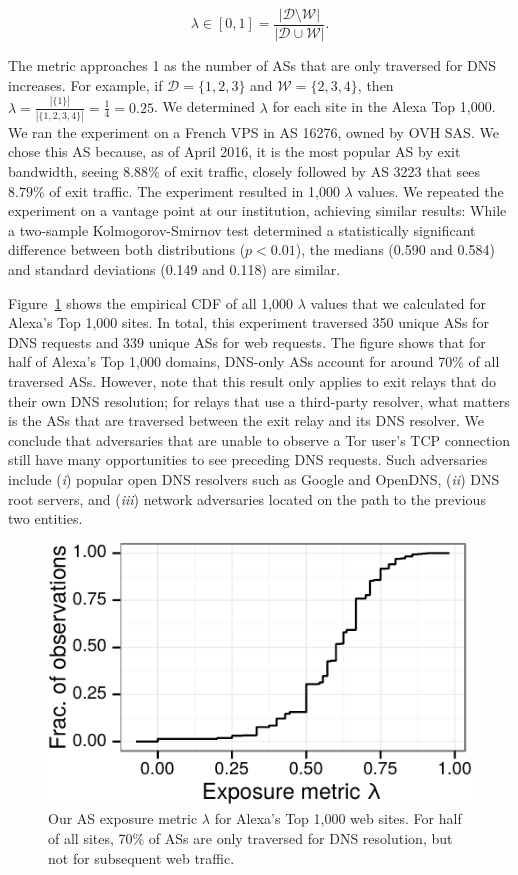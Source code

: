 \begin{equation}
\label{equ:exposure}
\lambda \in [0, 1] =
\frac{|\mathcal{D} \setminus \mathcal{W}|}
     {|\mathcal{D} \cup \mathcal{W}|}.
\end{equation}

The metric approaches 1 as the number of ASs that are only traversed for DNS
increases.  For example, if $\mathcal{D} = \{1,2,3\}$ and $\mathcal{W} =
\{2,3,4\}$, then $\lambda = \frac{|\{1\}|}{|\{1,2,3,4\}|} = \frac{1}{4} =
0.25$.  We determined $\lambda$ for each site in the Alexa Top 1,000.  We ran
the experiment on a French VPS in AS 16276, owned by OVH SAS.  We chose this AS
because, as of April 2016, it is the most popular AS by exit bandwidth, seeing
$8.88\%$ of exit traffic, closely followed by AS 3223 that sees $8.79\%$ of
exit traffic.  The experiment resulted in 1,000 $\lambda$ values.  We repeated
the experiment on a vantage point at our institution, achieving similar
results: While a two-sample Kolmogorov-Smirnov test determined a statistically
significant difference between both distributions ($p < 0.01$), the medians
(0.590 and 0.584) and standard deviations (0.149 and 0.118) are similar.

Figure~\ref{fig:exposure} shows the empirical CDF of all 1,000 $\lambda$ values
that we calculated for Alexa's Top 1,000 sites.  In total, this experiment
traversed 350 unique ASs for DNS requests and 339 unique ASs for web requests.
The figure shows that for half of Alexa's Top 1,000 domains, DNS-only ASs
account for around 70\% of all traversed ASs.  However, note that this result
only applies to exit relays that do their own DNS resolution; for relays that
use a third-party resolver, what matters is the ASs that are traversed between
the exit relay and its DNS resolver.  We conclude that adversaries that are
unable to observe a Tor user's TCP connection still have many opportunities to
see preceding DNS requests.  Such adversaries include (\emph{i}) popular open
DNS resolvers such as Google and OpenDNS, (\emph{ii}) DNS root servers, and
(\emph{iii}) network adversaries located on the path to the previous two
entities.


\begin{figure}[t]
	\centering
	\includegraphics[width=0.65\linewidth]{figures/dns-exposure.pdf}
	\caption{Our AS exposure metric $\lambda$ for Alexa's Top 1,000 web sites.
	For half of all sites, 70\% of ASs are only traversed for DNS resolution,
	but not for subsequent web traffic.}
	\label{fig:exposure}
\end{figure}

